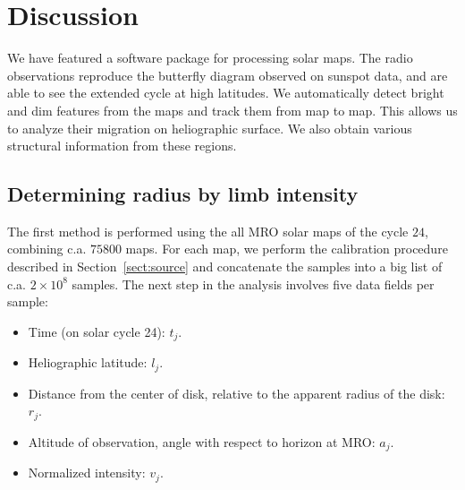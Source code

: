 \documentclass{aa}
\begin{document}
\section{Discussion}\label{sect:discussion}

We have featured a software package for processing solar maps. The radio observations reproduce the butterfly diagram 
observed on sunspot data, and are able to see the extended cycle at high latitudes. We automatically detect bright and 
dim features from the maps and track them from map to map. This allows us to analyze their migration on heliographic 
surface. We also obtain various structural information from these regions.

  \subsection{Determining radius by limb intensity} \label{sect:radius_method1}

  The first method is performed using the all MRO solar maps of the cycle $24$, combining c.a. $75800$ maps. For each 
  map, we perform the calibration procedure described in Section~\ref{sect:source} and concatenate the samples into a 
  big list of c.a. $2 \times 10^8$ samples. The next step in the analysis involves five data fields per sample:
  \begin{itemize}
  \item Time (on solar cycle 24): $t_j$.
  \item Heliographic latitude: $l_j$.
  \item Distance from the center of disk, relative to the apparent radius of the disk: $r_j$.
  \item Altitude of observation, angle with respect to horizon at MRO: $a_j$.
  \item Normalized intensity: $v_j$.
  \end{itemize}
\end{document}
